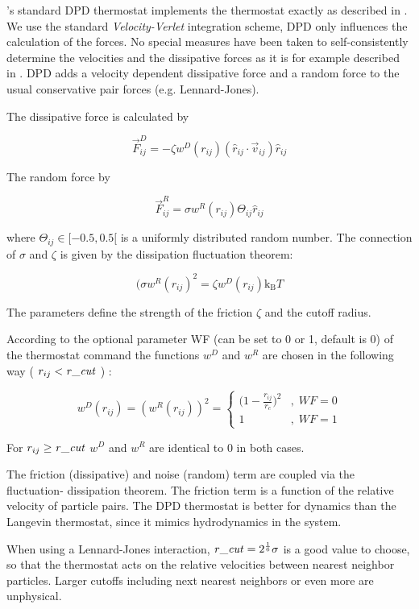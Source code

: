 \es's standard DPD thermostat implements the thermostat exactly as
described in \cite{soddeman03a}.  We use the standard
\textit{Velocity-Verlet} integration scheme, \eg DPD only influences
the calculation of the forces. No special measures have been taken to
self-consistently determine the velocities and the dissipative forces
as it is for example described in \cite{Nikunen03}.  DPD adds a
velocity dependent dissipative force and a random force to the usual
conservative pair forces (e.g. Lennard-Jones).

The dissipative force is calculated by

$$ \vec{F}_{ij}^{D} = -\zeta w^D (r_{ij}) (\hat{r}_{ij} \cdot \vec{v}_{ij}) \hat{r}_{ij} $$

The random force by

$$ \vec{F}_{ij}^R = \sigma w^R (r_{ij}) \Theta_{ij} \hat{r}_{ij} $$

where $ \Theta_{ij} \in [ -0.5 , 0.5 [ $ is a uniformly distributed random number.
The connection of $\sigma $ and $\zeta $ is given by the dissipation fluctuation theorem:
 
$$ (\sigma w^R (r_{ij})^2=\zeta w^D (r_{ij}) \text{k}_\text{B} T $$

The parameters   define the strength of the
friction $\zeta$ and the cutoff radius.

According to the optional parameter WF (can be set to 0 or 1, default
is 0) of the thermostat command the functions $w^D$ and $w^R$ are
chosen in the following way ( $ r_{ij} < \var{r\_cut} $ ) :

$$ 
w^D (r_{ij}) = ( w^R (r_{ij})) ^2 = 
   \left\{
   \begin{array}{clcr} 
             {( 1 - \frac{r_{ij}}{r_c}} )^2 & , \; WF = 0 \\
             1                      & , \; WF = 1
   \end{array}
   \right.
$$

For $ r_{ij} \ge \var{r\_cut} $  $w^D$ and $w^R$ are identical to 0 in both cases.

The friction (dissipative) and noise (random) term are coupled via the
fluctuation- dissipation theorem. The friction term is a function of
the relative velocity of particle pairs.  The DPD thermostat is better
for dynamics than the Langevin thermostat, since it mimics
hydrodynamics in the system.

When using a Lennard-Jones interaction, $\var{r\_cut} =
2^{\frac{1}{6}} \sigma$ is a good value to choose, so that the
thermostat acts on the relative velocities between nearest neighbor
particles.  Larger cutoffs including next nearest neighbors or even
more are unphysical.


